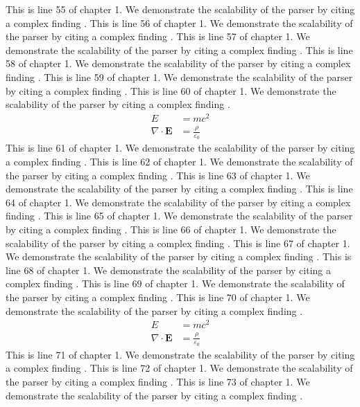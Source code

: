 This is line 55 of chapter 1. We demonstrate the scalability of the parser by citing a complex finding \cite{ref1_55}.
This is line 56 of chapter 1. We demonstrate the scalability of the parser by citing a complex finding \cite{ref1_56}.
This is line 57 of chapter 1. We demonstrate the scalability of the parser by citing a complex finding \cite{ref1_57}.
This is line 58 of chapter 1. We demonstrate the scalability of the parser by citing a complex finding \cite{ref1_58}.
This is line 59 of chapter 1. We demonstrate the scalability of the parser by citing a complex finding \cite{ref1_59}.
This is line 60 of chapter 1. We demonstrate the scalability of the parser by citing a complex finding \cite{ref1_60}.
\begin{align*}
  E &= mc^2 \\
  \nabla \cdot \mathbf{E} &= \frac{\rho}{\varepsilon_0}
\end{align*}
This is line 61 of chapter 1. We demonstrate the scalability of the parser by citing a complex finding \cite{ref1_61}.
This is line 62 of chapter 1. We demonstrate the scalability of the parser by citing a complex finding \cite{ref1_62}.
This is line 63 of chapter 1. We demonstrate the scalability of the parser by citing a complex finding \cite{ref1_63}.
This is line 64 of chapter 1. We demonstrate the scalability of the parser by citing a complex finding \cite{ref1_64}.
This is line 65 of chapter 1. We demonstrate the scalability of the parser by citing a complex finding \cite{ref1_65}.
This is line 66 of chapter 1. We demonstrate the scalability of the parser by citing a complex finding \cite{ref1_66}.
This is line 67 of chapter 1. We demonstrate the scalability of the parser by citing a complex finding \cite{ref1_67}.
This is line 68 of chapter 1. We demonstrate the scalability of the parser by citing a complex finding \cite{ref1_68}.
This is line 69 of chapter 1. We demonstrate the scalability of the parser by citing a complex finding \cite{ref1_69}.
This is line 70 of chapter 1. We demonstrate the scalability of the parser by citing a complex finding \cite{ref1_70}.
\begin{align*}
  E &= mc^2 \\
  \nabla \cdot \mathbf{E} &= \frac{\rho}{\varepsilon_0}
\end{align*}
This is line 71 of chapter 1. We demonstrate the scalability of the parser by citing a complex finding \cite{ref1_71}.
This is line 72 of chapter 1. We demonstrate the scalability of the parser by citing a complex finding \cite{ref1_72}.
This is line 73 of chapter 1. We demonstrate the scalability of the parser by citing a complex finding \cite{ref1_73}.
